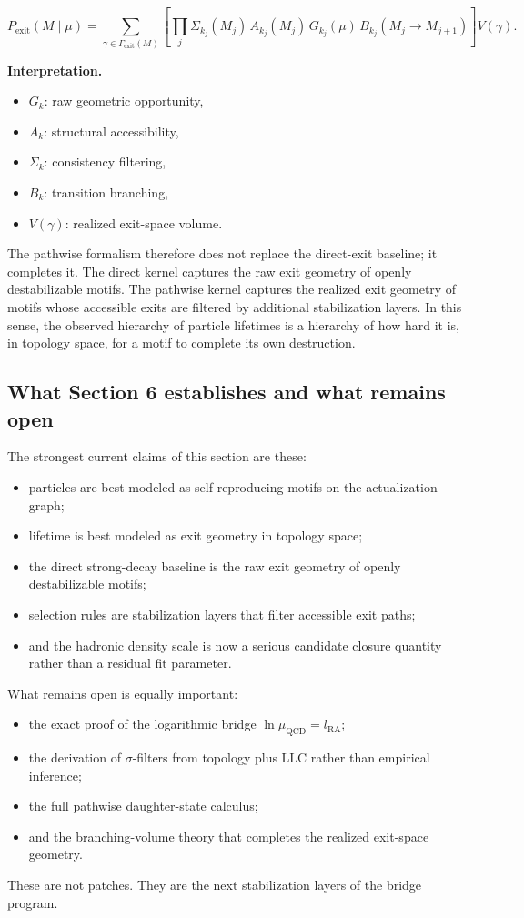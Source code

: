 \documentclass[11pt]{article}
\begin{document}
\[
P_{\mathrm{exit}}(M\mid\mu)
=
\sum_{\gamma\in\Gamma_{\mathrm{exit}}(M)}
\left[
\prod_{j}
\Sigma_{k_j}(M_j)\,
A_{k_j}(M_j)\,
G_{k_j}(\mu)\,
B_{k_j}(M_j\to M_{j+1})
\right]
V(\gamma).
\]

\noindent\textbf{Interpretation.}
\begin{itemize}
    \item $G_k$: raw geometric opportunity,
    \item $A_k$: structural accessibility,
    \item $\Sigma_k$: consistency filtering,
    \item $B_k$: transition branching,
    \item $V(\gamma)$: realized exit-space volume.
\end{itemize}

The pathwise formalism therefore does not replace the direct-exit baseline; it completes it. The direct kernel captures the raw exit geometry of openly destabilizable motifs. The pathwise kernel captures the realized exit geometry of motifs whose accessible exits are filtered by additional stabilization layers. In this sense, the observed hierarchy of particle lifetimes is a hierarchy of how hard it is, in topology space, for a motif to complete its own destruction.

\subsection{What Section 6 establishes and what remains open}
The strongest current claims of this section are these:
\begin{itemize}
    \item particles are best modeled as self-reproducing motifs on the actualization graph;
    \item lifetime is best modeled as exit geometry in topology space;
    \item the direct strong-decay baseline is the raw exit geometry of openly destabilizable motifs;
    \item selection rules are stabilization layers that filter accessible exit paths;
    \item and the hadronic density scale is now a serious candidate closure quantity rather than a residual fit parameter.
\end{itemize}

What remains open is equally important:
\begin{itemize}
    \item the exact proof of the logarithmic bridge $\ln\mu_{\mathrm{QCD}}=l_{\mathrm{RA}}$;
    \item the derivation of $\sigma$-filters from topology plus LLC rather than empirical inference;
    \item the full pathwise daughter-state calculus;
    \item and the branching-volume theory that completes the realized exit-space geometry.
\end{itemize}
These are not patches. They are the next stabilization layers of the bridge program.
\end{document}
